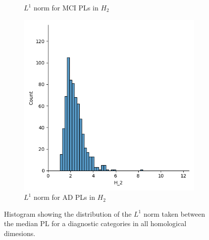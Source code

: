 \documentclass{article}
\begin{document}
\begin{figure}
\begin{subfigure}{0.32\textwidth}
    \caption{$L^1$ norm for MCI PLs in $H_2$}
  \end{subfigure}
  \begin{subfigure}{0.32\textwidth}
    \includegraphics[width=\textwidth]{figures/median_pls/median_pl_AD_H_2.png}
    \caption{$L^1$ norm for AD PLs in $H_2$}
  \end{subfigure}
  \caption{Histogram showing the distribution of the $L^1$ norm taken between the median PL for a
    diagnostic categories in all homological dimesions.}
  \label{fig:displots_median_pl}
\end{figure}
\end{document}
